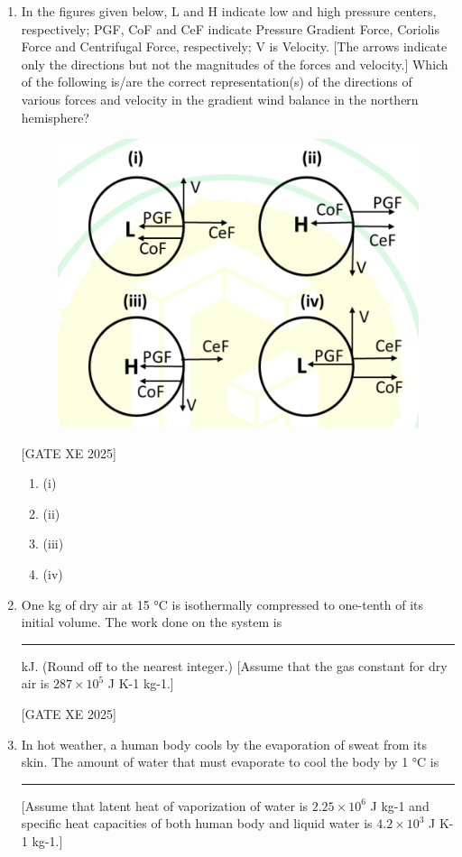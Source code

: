 \documentclass[journal,12pt,onecolumn]{IEEEtran}
\theoremstyle{remark}
\begin{document}
\begin{enumerate}
\item In the figures given below, L and H indicate low and high pressure centers, respectively; PGF, CoF and CeF indicate Pressure Gradient Force, Coriolis Force and Centrifugal Force, respectively; V is Velocity. [The arrows indicate only the directions but not the magnitudes of the forces and velocity.]
Which of the following is/are the correct representation(s) of the directions of various forces and velocity in the gradient wind balance in the northern hemisphere?

\begin{figure}[H]
    \centering
    \includegraphics[width=0.5\columnwidth]{figs/fig36.png}
    \caption{}
    \label{fig:placeholder}
\end{figure}

\hfill[GATE XE 2025]

\begin{multicols}{2}
\begin{enumerate}
\item (i)
\item (ii)
\item (iii)
\item (iv)
\end{enumerate}
\end{multicols}

\item One kg of dry air at 15 °C is isothermally compressed to one-tenth of its initial volume. The work done on the system is \rule{3cm}{0.15mm} kJ. (Round off to the nearest integer.)
[Assume that the gas constant for dry air is $287 \times 10^{5}$
 J K-1 kg-1.]

\hfill[GATE XE 2025]

\item In hot weather, a human body cools by the evaporation of sweat from its skin. The amount of water that must evaporate to cool the body by 1 °C is \rule{3cm}{0.15mm} %
[Assume that latent heat of vaporization of water is $2.25 \times 10^{6}$
 J kg-1 and specific heat capacities of both human body and liquid water is $4.2 \times 10^{3}$
 J K-1 kg-1.]


\end{enumerate}
\end{document}
